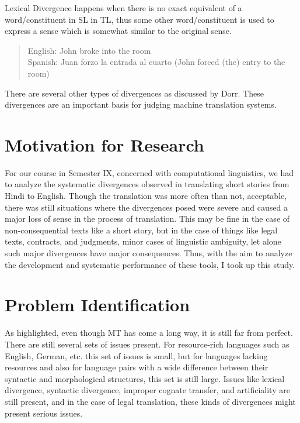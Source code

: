 Lexical Divergence happens when there is no exact equivalent of a word/constituent in SL in TL, thus some other word/constituent is used to express a sense which is somewhat similar to the original sense.

\begin{quote}
English: John broke into the room \\
Spanish: Juan forzo la entrada al cuarto (John forced (the) entry to the room)
\end{quote}

There are several other types of divergences as discussed by Dorr. These divergences are an important basis for judging machine translation systems.

\section{Motivation for Research}

For our course in Semester IX, concerned with computational linguistics, we had to analyze the systematic divergences observed in translating short stories from Hindi to English. Though the translation was more often than not, acceptable, there was still situations where the divergences posed were severe and caused a major loss of sense in the process of translation. This may be fine in the case of non-consequential texts like a short story, but in the case of things like legal texts, contracts, and judgments, minor cases of linguistic ambiguity, let alone such major divergences have major consequences. Thus, with the aim to analyze the development and systematic performance of these tools, I took up this study. 

\section{Problem Identification}

As highlighted, even though MT has come a long way, it is still far from perfect. There are still several sets of issues present. For resource-rich languages such as English, German, etc. this set of issues is small, but for languages lacking resources and also for language pairs with a wide difference between their syntactic and morphological structures, this set is still large. Issues like lexical divergence, syntactic divergence, improper cognate transfer, and artificiality are still present, and in the case of legal translation, these kinds of divergences might present serious issues. 

